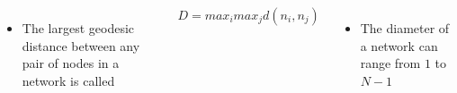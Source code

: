\documentclass[8pt]{beamer}
\begin{document}

\begin{frame}
\frametitle{\insertsection}
\framesubtitle{\insertsubsection}

\begin{columns}

\begin{itemize}
\item The largest geodesic distance between any pair of nodes in a network is called {\color{blue}{diameter}}
\end{itemize}	

\begin{equation*}
D=max_i max_j d(n_i,n_j)
\end{equation*}

\begin{itemize}
\item The diameter of a network can range from $1$ to $N-1$
\end{itemize}

\centering
{}
            

\end{columns}

\end{frame}
\end{document}
